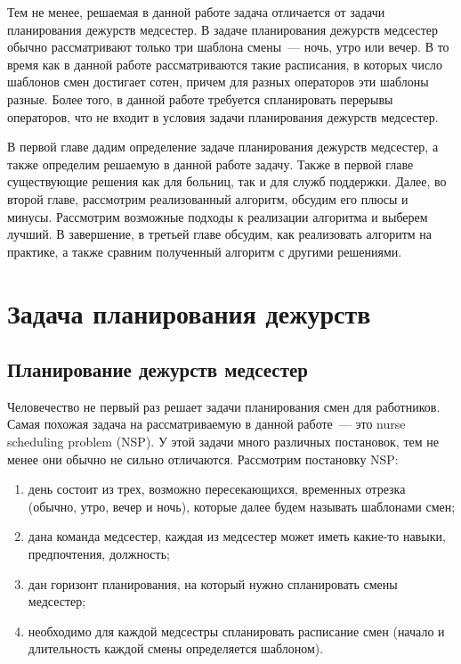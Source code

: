 \documentclass[times,specification,annotation]{itmo-student-thesis}
\begin{document}
Тем не менее, решаемая в данной работе задача отличается от задачи планирования дежурств медсестер.
В задаче планирования дежурств медсестер обычно рассматривают только три шаблона смены~--- ночь, утро или вечер.
В то время как в данной работе рассматриваются такие расписания, в которых число шаблонов смен достигает сотен, причем для разных операторов эти шаблоны разные.
Более того, в данной работе требуется спланировать перерывы операторов, что не входит в условия задачи планирования дежурств медсестер.

В первой главе дадим определение задаче планирования дежурств медсестер, а также определим решаемую в данной работе задачу.
Также в первой главе существующие решения как для больниц, так и для служб поддержки.
Далее, во второй главе, рассмотрим реализованный алгоритм, обсудим его плюсы и минусы.
Рассмотрим возможные подходы к реализации алгоритма и выберем лучший.
В завершение, в третьей главе обсудим, как реализовать алгоритм на практике, а также сравним полученный алгоритм с другими решениями.

\chapter{Задача планирования дежурств}

\startrelatedwork
\section{Планирование дежурств медсестер}

Человечество не первый раз решает задачи планирования смен для работников.
Самая похожая задача на рассматриваемую в данной работе~--- это nurse scheduling problem (NSP).
У этой задачи много различных постановок, тем не менее они обычно не сильно отличаются.
Рассмотрим постановку NSP:

\begin{enumerate}
    \item день состоит из трех, возможно пересекающихся, временных отрезка (обычно, утро, вечер и ночь), которые далее будем называть шаблонами смен;
    \item дана команда медсестер, каждая из медсестер может иметь какие-то навыки, предпочтения, должность;
    \item дан горизонт планирования, на который нужно спланировать смены медсестер;
    \item необходимо для каждой медсестры спланировать расписание смен (начало и длительность каждой смены определяется шаблоном).
\end{enumerate}
\end{document}

